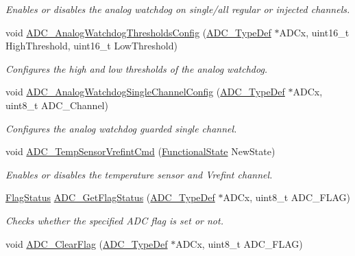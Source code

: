 \begin{DoxyCompactItemize}
\begin{DoxyCompactList}\small\item\em Enables or disables the analog watchdog on single/all regular or injected channels. \end{DoxyCompactList}\item 
void \hyperlink{group___a_d_c___private___functions_ga79588d02aa8e4147f21cb90a4708366d}{A\+D\+C\+\_\+\+Analog\+Watchdog\+Thresholds\+Config} (\hyperlink{struct_a_d_c___type_def}{A\+D\+C\+\_\+\+Type\+Def} $\ast$A\+D\+Cx, uint16\+\_\+t High\+Threshold, uint16\+\_\+t Low\+Threshold)
\begin{DoxyCompactList}\small\item\em Configures the high and low thresholds of the analog watchdog. \end{DoxyCompactList}\item 
void \hyperlink{group___a_d_c___private___functions_ga03cef3d12292ffa2b8520524d5b0226c}{A\+D\+C\+\_\+\+Analog\+Watchdog\+Single\+Channel\+Config} (\hyperlink{struct_a_d_c___type_def}{A\+D\+C\+\_\+\+Type\+Def} $\ast$A\+D\+Cx, uint8\+\_\+t A\+D\+C\+\_\+\+Channel)
\begin{DoxyCompactList}\small\item\em Configures the analog watchdog guarded single channel. \end{DoxyCompactList}\item 
void \hyperlink{group___a_d_c___private___functions_ga848682e2d7d3de9f8cf03ffa4c11f0b5}{A\+D\+C\+\_\+\+Temp\+Sensor\+Vrefint\+Cmd} (\hyperlink{group___exported__types_gac9a7e9a35d2513ec15c3b537aaa4fba1}{Functional\+State} New\+State)
\begin{DoxyCompactList}\small\item\em Enables or disables the temperature sensor and Vrefint channel. \end{DoxyCompactList}\item 
\hyperlink{group___exported__types_ga89136caac2e14c55151f527ac02daaff}{Flag\+Status} \hyperlink{group___a_d_c___private___functions_gaa12546e51ec905c90a3aada432bd4633}{A\+D\+C\+\_\+\+Get\+Flag\+Status} (\hyperlink{struct_a_d_c___type_def}{A\+D\+C\+\_\+\+Type\+Def} $\ast$A\+D\+Cx, uint8\+\_\+t A\+D\+C\+\_\+\+F\+L\+AG)
\begin{DoxyCompactList}\small\item\em Checks whether the specified A\+DC flag is set or not. \end{DoxyCompactList}\item 
void \hyperlink{group___a_d_c___private___functions_gaf34f36798f811b4a41321ea2d12118d4}{A\+D\+C\+\_\+\+Clear\+Flag} (\hyperlink{struct_a_d_c___type_def}{A\+D\+C\+\_\+\+Type\+Def} $\ast$A\+D\+Cx, uint8\+\_\+t A\+D\+C\+\_\+\+F\+L\+AG)

\end{DoxyCompactItemize}
